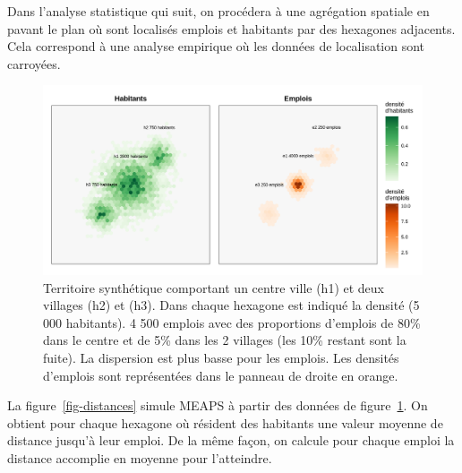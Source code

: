 \documentclass[
  10pt,
  a4paper,
  numbers=noendperiod,
  DIV=9]{scrreprt}
\begin{document}
Dans l'analyse statistique qui suit, on procédera à une agrégation
spatiale en pavant le plan où sont localisés emplois et habitants par
des hexagones adjacents. Cela correspond à une analyse empirique où les
données de localisation sont carroyées.

\begin{figure}[htb]

{\centering \includegraphics[width=1\textwidth,height=\textheight]{./output/gcarte_ss.png}

}

\caption[Territoire synthétique (centre + 2
villages)]{\label{fig-territoire}Territoire synthétique comportant un
centre ville (h1) et deux villages (h2) et (h3). Dans chaque hexagone
est indiqué la densité (5 000 habitants). 4 500 emplois avec des
proportions d'emplois de 80\% dans le centre et de 5\% dans les 2
villages (les 10\% restant sont la fuite). La dispersion est plus basse
pour les emplois. Les densités d'emplois sont représentées dans le
panneau de droite en orange.}

\end{figure}

La figure~\ref{fig-distances} simule MEAPS à partir des données de
figure~\ref{fig-territoire}. On obtient pour chaque hexagone où résident
des habitants une valeur moyenne de distance jusqu'à leur emploi. De la
même façon, on calcule pour chaque emploi la distance accomplie en
moyenne pour l'atteindre.
\end{document}
